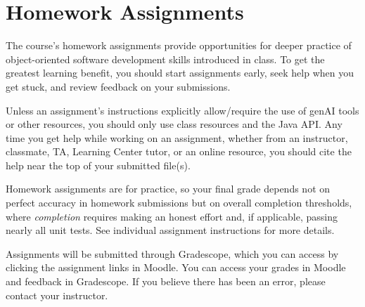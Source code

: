 \section*{Homework Assignments}
The course's homework assignments provide 
opportunities for deeper practice of 
object-oriented software development skills introduced in class. 
To get the greatest learning benefit, 
you should start assignments early, 
seek help when you get stuck, and 
review feedback on your submissions. 

Unless an assignment's instructions 
explicitly allow/require the use of 
genAI tools or other resources, 
you should only use class resources and the Java {API}. 
Any time you get help while working on an assignment, 
whether from an instructor, classmate, TA, 
Learning Center tutor, or an online resource, 
you should cite the help near the top of your submitted file{(s)}. 

Homework assignments are for practice, 
so your final grade depends not on perfect accuracy in homework submissions 
but on overall completion thresholds, 
where \emph{completion} requires making an honest effort and, if applicable, 
passing nearly all unit tests. 
See individual assignment instructions for more details. 

Assignments will be submitted through Gradescope, 
which you can access by clicking the assignment links in Moodle. 
You can access your grades in Moodle 
and feedback in Gradescope. 
If you believe there has been an error, 
please contact your instructor. 

